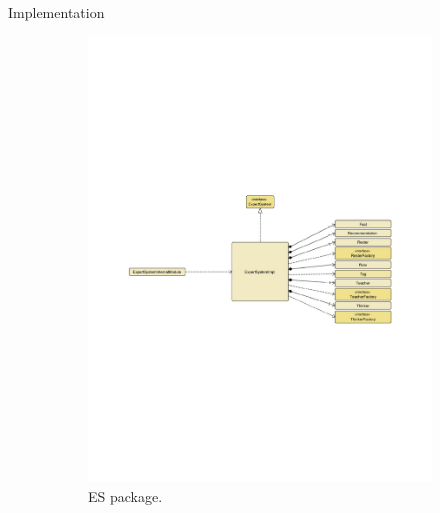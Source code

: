 \documentclass[final]{beamer} %
\begin{document}
\begin{columns}
\begin{column}{.35\textwidth}
\begin{block}{Implementation}
		\begin{figure}[!htb]
			\centering
			\begin{subfigure}[!htb]{0.4\columnwidth}
				\centering
				\includegraphics[width=\columnwidth]{figures/es_uml.pdf}
				\caption
				{ES package.}
			\end{subfigure}
			~
			\begin{subfigure}[!htb]{0.4\columnwidth}
				\centering

\end{subfigure}
\end{figure}
\end{block}
\end{column}
\end{columns}
\end{document}
